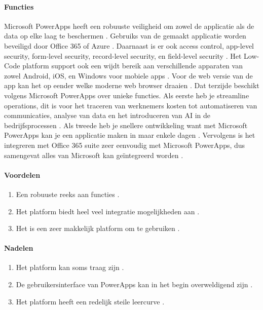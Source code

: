 \paragraph{Functies}
Microsoft PowerApps heeft een robuuste veiligheid om zowel de applicatie als de data op elke laag te beschermen \autocite{Nguyen}.
Gebruiks van de gemaakt applicatie worden beveiligd door Office 365 of Azure \autocite{Nguyen}. Daarnaast is er ook access control, app-level security, form-level security, record-level security, en field-level security  \autocite{Nguyen}.
Het Low-Code platform support ook een wijdt bereik aan verschillende apparaten van zowel Android, iOS, en Windows voor mobiele apps \autocite{Nguyen}.
Voor de web versie van de app kan het op eender welke moderne web browser draaien \autocite{Nguyen}. Dat terzijde beschikt volgens \textcite{Gupta2023} Microsoft PowerApps over unieke functies. Als eerste heb je 
streamline operations, dit is voor het traceren van werknemers kosten tot automatiseren van communicaties, analyse van data en het introduceren van AI in de bedrijfsprocessen \autocite{Gupta2023}.
Als tweede heb je snellere ontwikkeling want met Microsoft PowerApps kan je een applicatie maken in maar enkele dagen \autocite{Gupta2023}. Vervolgens is het integreren met Office 365 suite zeer eenvoudig met Microsoft PowerApps,
 dus samengevat alles van Microsoft kan geïntegreerd worden \autocite{Gupta2023}.

 \paragraph*{Voordelen}
\begin{enumerate}
    \item Een robuuste reeks aan functies \autocite{Marvin2018}.
    \item Het platform biedt heel veel integratie mogelijkheden aan \autocite{Marvin2018}.
    \item Het is een zeer makkelijk platform om te gebruiken \autocite{Marvin2018}.
\end{enumerate}


\paragraph*{Nadelen}
\begin{enumerate}
    \item Het platform kan soms traag zijn \autocite{Marvin2018}.
    \item De gebruikersinterface van PowerApps kan in het begin overweldigend zijn \autocite{Marvin2018}.
    \item Het platform heeft een redelijk steile leercurve \autocite{Marvin2018}.
\end{enumerate}

